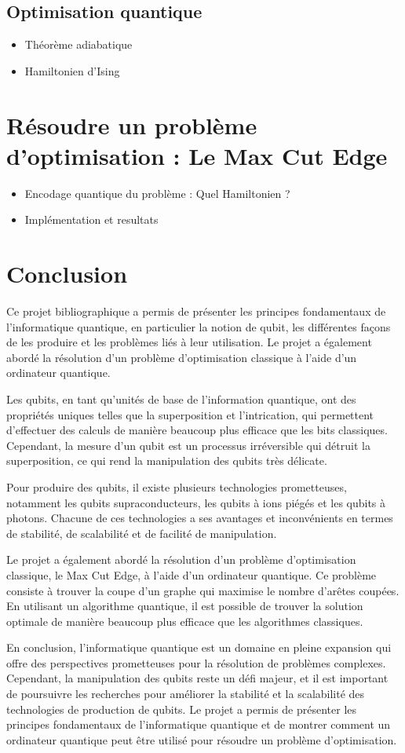 \documentclass[12pt]{article}
\begin{document}
\subsection{Optimisation quantique}
\begin{itemize}
    \item Théorème adiabatique
    \item Hamiltonien d’Ising
\end{itemize}

\section{Résoudre un problème d’optimisation : Le Max Cut Edge}
\begin{itemize}
    \item Encodage quantique du problème : Quel Hamiltonien ?
    \item Implémentation et resultats
\end{itemize}


\section{Conclusion}

Ce projet bibliographique a permis de présenter les principes fondamentaux de l'informatique quantique, en particulier la notion de qubit, les différentes façons de les produire et les problèmes liés à leur utilisation. Le projet a également abordé la résolution d'un problème d'optimisation classique à l'aide d'un ordinateur quantique.

Les qubits, en tant qu'unités de base de l'information quantique, ont des propriétés uniques telles que la superposition et l'intrication, qui permettent d'effectuer des calculs de manière beaucoup plus efficace que les bits classiques. Cependant, la mesure d'un qubit est un processus irréversible qui détruit la superposition, ce qui rend la manipulation des qubits très délicate.

Pour produire des qubits, il existe plusieurs technologies prometteuses, notamment les qubits supraconducteurs, les qubits à ions piégés et les qubits à photons. Chacune de ces technologies a ses avantages et inconvénients en termes de stabilité, de scalabilité et de facilité de manipulation.

Le projet a également abordé la résolution d'un problème d'optimisation classique, le Max Cut Edge, à l'aide d'un ordinateur quantique. Ce problème consiste à trouver la coupe d'un graphe qui maximise le nombre d'arêtes coupées. En utilisant un algorithme quantique, il est possible de trouver la solution optimale de manière beaucoup plus efficace que les algorithmes classiques.

En conclusion, l'informatique quantique est un domaine en pleine expansion qui offre des perspectives prometteuses pour la résolution de problèmes complexes. Cependant, la manipulation des qubits reste un défi majeur, et il est important de poursuivre les recherches pour améliorer la stabilité et la scalabilité des technologies de production de qubits. Le projet a permis de présenter les principes fondamentaux de l'informatique quantique et de montrer comment un ordinateur quantique peut être utilisé pour résoudre un problème d'optimisation.
\end{document}
